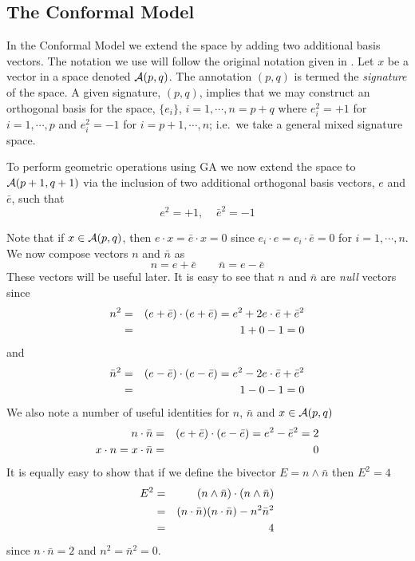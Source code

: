 \subsection{The Conformal Model}

In the Conformal Model \cite{GA:NFCM} we extend the space by adding two 
additional basis
vectors. 
The notation we use will follow the original notation given in
\cite{HS84}. Let $x$ be a vector in a space denoted ${\mathcal{A}}(p,q)$.
The annotation $(p,q)$ is termed the \emph{signature} of the space. 
A given signature, $(p,q)$, implies that we may construct an 
orthogonal basis for the space,
$\{e_i\}$, $i=1,\cdots,n=p+q$ where $e_i^2=+1$ for $i=1,\cdots,p$
and $e_i^2=-1$ for $i=p+1,\cdots,n$; i.e.\ we take a general mixed
signature space.  

To perform geometric operations using GA we now extend the space 
to ${\mathcal{A}}(p+1,q+1)$ via the inclusion of two additional orthogonal
basis  vectors, $e$ and
$\bar{e}$, such that
%
\[  e^2=+1,\;\;\;\; \bar{e}^2= -1
\]
%

Note that if $x \in {\mathcal{A}}(p,q)$, then $e\cdot x =
\bar{e}\cdot x = 0$ since $e_i\cdot e=e_i \cdot \bar{e} = 0$
for $i=1,\cdots,n$. We now compose vectors $n$ and
$\bar{n}$ as
%
\[ n = e + \bar{e}  \qquad  \bar{n} = e - \bar{e} 
\label{nequations}
\]
%
These vectors will be useful later. It is easy to see that
$n$ and $\bar{n}$ are \emph{null} vectors since
%
\begin{eqnarray}
n^2  & = & (e + \bar{e})\cdot(e + \bar{e}) = e^2 + 2e\cdot\bar{e} + \bar{e}^2 \nonumber \\
       & = &  1 + 0 - 1 = 0  \nonumber
\end{eqnarray}
and
\begin{eqnarray}
\bar{n}^2  & = & (e - \bar{e})\cdot(e - \bar{e}) = e^2 - 2e\cdot\bar{e} + \bar{e}^2 \nonumber \\
       & = &  1 - 0 - 1 = 0     \nonumber
\end{eqnarray}
%
We also note a number of useful identities for $n$, $\bar{n}$ and $x \in \mathcal{A}(p,q)$
%
\begin{eqnarray}
n\cdot\bar{n} & = & (e + \bar{e})\cdot(e - \bar{e}) = e^2 - \bar{e}^2 = 2 \nonumber \\
x\cdot n = x\cdot \bar{n} & = & 0 \nonumber 
\end{eqnarray}
%
It is equally easy to show that if we define the bivector $E = n \wedge \bar{n}$ 
then $E^2 = 4$
%
\begin{eqnarray}
  E^2 & = &  (n\wedge \bar{n})\cdot(n\wedge \bar{n}) \nonumber \\
  & = &  (n\cdot\bar{n})(n\cdot\bar{n}) - n^2 \bar{n}^2 \nonumber \\
  & = &  4
  \end{eqnarray}
since $n\cdot\bar{n}=2$ and $n^2=\bar{n}^2=0$.

